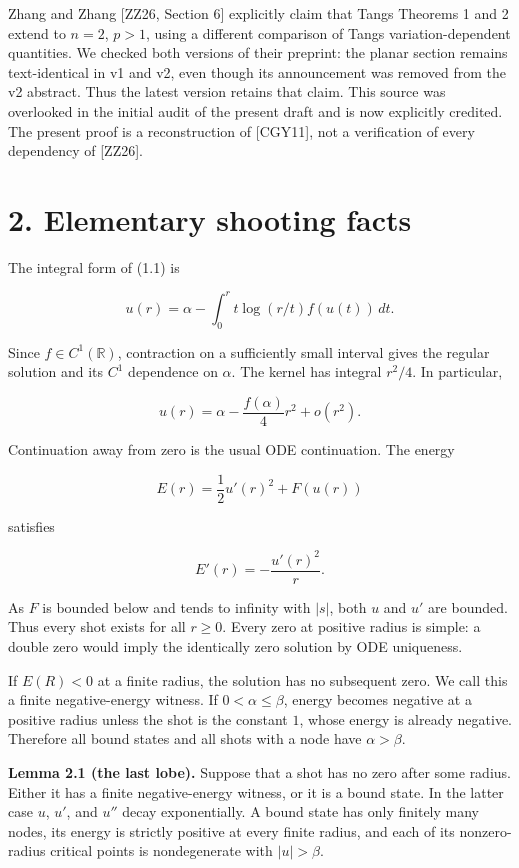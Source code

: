 \documentclass[11pt]{article}
\begin{document}
Zhang and Zhang {[}ZZ26, Section 6{]} explicitly claim that
Tang\textquotesingle s Theorems 1 and 2 extend to \(n=2\), \(p>1\),
using a different comparison of Tang\textquotesingle s
variation-dependent quantities. We checked both versions of their
preprint: the planar section remains text-identical in v1 and v2, even
though its announcement was removed from the v2 abstract. Thus the
latest version retains that claim. This source was overlooked in the
initial audit of the present draft and is now explicitly credited. The
present proof is a reconstruction of {[}CGY11{]}, not a verification of
every dependency of {[}ZZ26{]}.

\section{2. Elementary shooting facts}\label{elementary-shooting-facts}

The integral form of (1.1) is

\[
u(r)=\alpha-\int_0^r t\log(r/t)f(u(t))\,dt. \tag{2.1}
\]

Since \(f\in C^1(\mathbb R)\), contraction on a sufficiently small
interval gives the regular solution and its \(C^1\) dependence on
\(\alpha\). The kernel has integral \(r^2/4\). In particular,

\[u(r)=\alpha-\frac{f(\alpha)}4r^2+o(r^2).\]

Continuation away from zero is the usual ODE continuation. The energy

\[E(r)=\frac12u'(r)^2+F(u(r))\]

satisfies

\[E'(r)=-\frac{u'(r)^2}{r}. \tag{2.2}\]

As \(F\) is bounded below and tends to infinity with \(|s|\), both \(u\)
and \(u'\) are bounded. Thus every shot exists for all \(r\geq0\). Every
zero at positive radius is simple: a double zero would imply the
identically zero solution by ODE uniqueness.

If \(E(R)<0\) at a finite radius, the solution has no subsequent zero.
We call this a finite negative-energy witness. If \(0<\alpha\leq\beta\),
energy becomes negative at a positive radius unless the shot is the
constant \(1\), whose energy is already negative. Therefore all bound
states and all shots with a node have \(\alpha>\beta\).

\textbf{Lemma 2.1 (the last lobe).} Suppose that a shot has no zero
after some radius. Either it has a finite negative-energy witness, or it
is a bound state. In the latter case \(u\), \(u'\), and \(u''\) decay
exponentially. A bound state has only finitely many nodes, its energy is
strictly positive at every finite radius, and each of its nonzero-radius
critical points is nondegenerate with \(|u|>\beta\).
\end{document}
